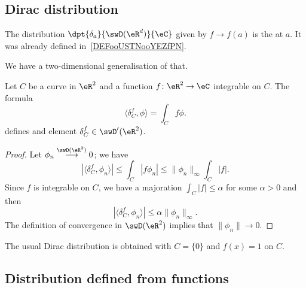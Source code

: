 \subsection{Dirac distribution}

The distribution $\dpt{\delta_a}{\swD(\eR^d)}{\eC}$ given by $f\to f(a)$ is the  at $a$. It was already defined in~\ref{DEFooUSTNooYEZfPN}.

We have a two-dimensional generalisation of that.

\begin{lemmaDef}        \label{LEMooYABKooWPXIXZ}
    Let \( C\) be a curve in \( \eR^2\) and a function \( f\colon \eR^2\to \eC\) integrable on \( C\). The formula
    \begin{equation}
       \langle \delta_C^f, \phi\rangle =\int_Cf\phi.
    \end{equation}
    defines and element \( \delta_C^f\in \swD'(\eR^2) \).
\end{lemmaDef}

\begin{proof}
    Let \( \phi_n\stackrel{\swD(\eR^2)}{\longrightarrow}0\); we have
    \begin{equation}
        |\langle \delta_C^{f}, \phi_n\rangle |\leq\int_C|f\phi_n|\leq  \| \phi_n \|_{\infty}   \int_C| f |.
    \end{equation}
    Since \( f\) is integrable on \( C\), we have a majoration \( \int_C| f |\leq \alpha\) for some \( \alpha>0\) and then
    \begin{equation}
        |\langle \delta_C^{f}, \phi_n\rangle |\leq \alpha\| \phi_n \|_{\infty}.
    \end{equation}
    The definition of convergence in \( \swD(\eR^2)\) implies that \( \| \phi_n \|\to 0\).
\end{proof}

The usual Dirac distribution is obtained with \( C=\{ 0 \}\) and \( f(x)=1\) on $C$.

\subsection{Distribution defined from functions}


